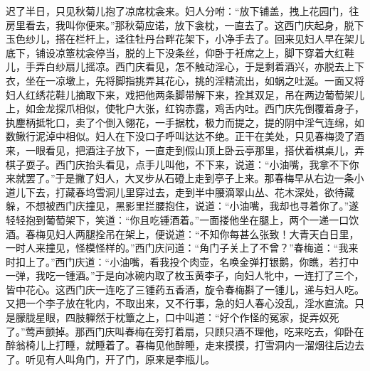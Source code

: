 迟了半日，只见秋菊儿抱了凉席枕衾来。妇人分咐：“放下铺盖，拽上花园门，往房里看去，我叫你便来。”那秋菊应诺，放下衾枕，一直去了。这西门庆起身，脱下玉色纱\textYiXuan 儿，搭在栏杆上，迳往牡丹台畔花架下，小净手去了。回来见妇人早在架儿底下，铺设凉簟枕衾停当，脱的上下没条丝，仰卧于衽席之上，脚下穿着大红鞋儿，手弄白纱扇儿摇凉。西门庆看见，怎不触动淫心，于是剩着酒兴，亦脱去上下衣，坐在一凉墩上，先将脚指挑弄其花心，挑的淫精流出，如蜗之吐涎。一面又将妇人红绣花鞋儿摘取下来，戏把他两条脚带解下来，拴其双足，吊在两边葡萄架儿上，如金龙探爪相似，使牝户大张，红钩赤露，鸡舌内吐。西门庆先倒覆着身子，执麈柄抵牝口，卖了个倒入翎花，一手据枕，极力而提之，提的阴中淫气连绵，如数鳅行泥淖中相似。妇人在下没口子呼叫达达不绝。正干在美处，只见春梅烫了酒来，一眼看见，把酒注子放下，一直走到假山顶上卧云亭那里，搭伏着棋桌儿，弄棋子耍子。西门庆抬头看见，点手儿叫他，不下来，说道：“小油嘴，我拿不下你来就罢了。”于是撇了妇人，大叉步从石磴上走到亭子上来。那春梅早从右边一条小道儿下去，打藏春坞雪洞儿里穿过去，走到半中腰滴翠山丛、花木深处，欲待藏躲，不想被西门庆撞见，黑影里拦腰抱住，说道：“小油嘴，我却也寻着你了。”遂轻轻抱到葡萄架下，笑道：“你且吃锺酒着。”一面搂他坐在腿上，两个一递一口饮酒。春梅见妇人两腿拴吊在架上，便说道：“不知你每甚么张致！大青天白日里，一时人来撞见，怪模怪样的。”西门庆问道：“角门子关上了不曾？”春梅道：“我来时扣上了。”西门庆道：“小油嘴，看我投个肉壶，名唤金弹打银鹅，你瞧，若打中一弹，我吃一锺酒。”于是向冰碗内取了枚玉黄李子，向妇人牝中，一连打了三个，皆中花心。这西门庆一连吃了三锺药五香酒，旋令春梅斟了一锺儿，递与妇人吃。又把一个李子放在牝内，不取出来，又不行事，急的妇人春心没乱，淫水直流。只是朦胧星眼，四肢軃然于枕簟之上，口中叫道：“好个作怪的冤家，捉弄奴死了。”莺声颤掉。那西门庆叫春梅在旁打着扇，只顾只酒不理他，吃来吃去，仰卧在醉翁椅儿上打睡，就睡着了。春梅见他醉睡，走来摸摸，打雪洞内一溜烟往后边去了。听见有人叫角门，开了门，原来是李瓶儿。

